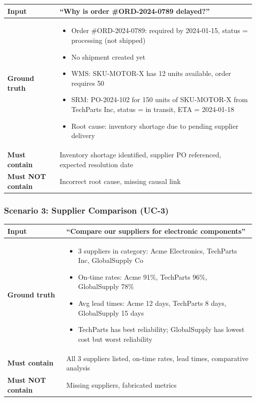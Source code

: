 \documentclass[11pt,a4paper]{article}
\begin{document}
\begin{table}[H]
\centering\small
\begin{tabularx}{\textwidth}{@{} l X @{}}
\toprule
\textbf{Input}        & ``Why is order \#ORD-2024-0789 delayed?'' \\
\midrule
\textbf{Ground truth} &
    \begin{itemize}[nosep,leftmargin=1em]
        \item Order \#ORD-2024-0789: required by 2024-01-15, status = processing (not shipped)
        \item No shipment created yet
        \item WMS: SKU-MOTOR-X has 12 units available, order requires 50
        \item SRM: PO-2024-102 for 150 units of SKU-MOTOR-X from TechParts Inc, status = in transit, ETA = 2024-01-18
        \item Root cause: inventory shortage due to pending supplier delivery
    \end{itemize} \\
\textbf{Must contain}  & Inventory shortage identified, supplier PO referenced, expected resolution date \\
\textbf{Must NOT contain} & Incorrect root cause, missing causal link \\
\bottomrule
\end{tabularx}
\end{table}

\subsubsection{Scenario 3: Supplier Comparison (UC-3)}

\begin{table}[H]
\centering\small
\begin{tabularx}{\textwidth}{@{} l X @{}}
\toprule
\textbf{Input}        & ``Compare our suppliers for electronic components'' \\
\midrule
\textbf{Ground truth} &
    \begin{itemize}[nosep,leftmargin=1em]
        \item 3 suppliers in category: Acme Electronics, TechParts Inc, GlobalSupply Co
        \item On-time rates: Acme 91\%, TechParts 96\%, GlobalSupply 78\%
        \item Avg lead times: Acme 12 days, TechParts 8 days, GlobalSupply 15 days
        \item TechParts has best reliability; GlobalSupply has lowest cost but worst reliability
    \end{itemize} \\
\textbf{Must contain}  & All 3 suppliers listed, on-time rates, lead times, comparative analysis \\
\textbf{Must NOT contain} & Missing suppliers, fabricated metrics \\
\bottomrule
\end{tabularx}
\end{table}
\end{document}
